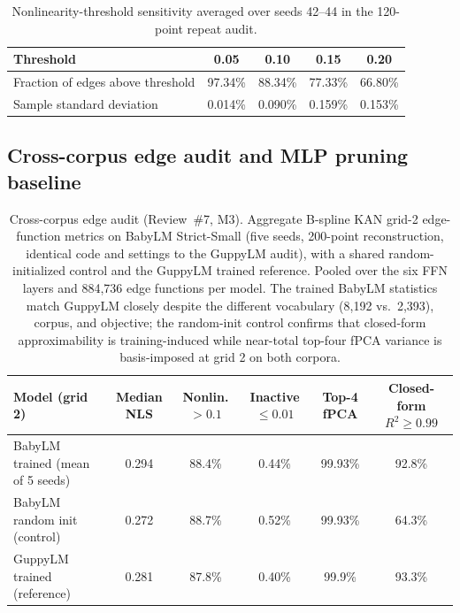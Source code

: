 \documentclass[11pt]{article}
\begin{document}
\begin{table}[htbp]
\centering
\caption{Nonlinearity-threshold sensitivity averaged over seeds 42--44 in the 120-point repeat audit.}
\label{tab:threshold}
\begin{tabular}{@{}lcccc@{}}
\toprule
Threshold & 0.05 & 0.10 & 0.15 & 0.20 \\
\midrule
Fraction of edges above threshold & 97.34\% & 88.34\% & 77.33\% & 66.80\% \\
Sample standard deviation & 0.014\% & 0.090\% & 0.159\% & 0.153\% \\
\bottomrule
\end{tabular}
\end{table}

\subsection{Cross-corpus edge audit and MLP pruning baseline}

\begin{table}[htbp]
\centering
\caption{Cross-corpus edge audit (Review~\#7, M3). Aggregate B-spline KAN grid-2 edge-function metrics on BabyLM Strict-Small (five seeds, 200-point reconstruction, identical code and settings to the GuppyLM audit), with a shared random-initialized control and the GuppyLM trained reference. Pooled over the six FFN layers and 884,736 edge functions per model. The trained BabyLM statistics match GuppyLM closely despite the different vocabulary (8,192 vs.\ 2,393), corpus, and objective; the random-init control confirms that closed-form approximability is training-induced while near-total top-four fPCA variance is basis-imposed at grid 2 on both corpora.}
\label{tab:babylm-audit}
\begin{tabular}{@{}lccccc@{}}
\toprule
Model (grid 2) & Median NLS & Nonlin. \(>0.1\) & Inactive \(\leq0.01\) & Top-4 fPCA & Closed-form \(R^2{\geq}0.99\) \\
\midrule
BabyLM trained (mean of 5 seeds) & 0.294 & 88.4\% & 0.44\% & 99.93\% & 92.8\% \\
BabyLM random init (control)     & 0.272 & 88.7\% & 0.52\% & 99.93\% & 64.3\% \\
GuppyLM trained (reference)      & 0.281 & 87.8\% & 0.40\% & 99.9\%  & 93.3\% \\
\bottomrule
\end{tabular}
\end{table}
\end{document}
